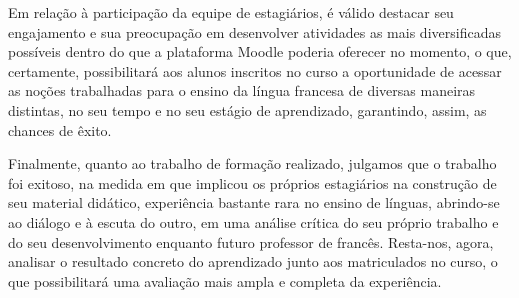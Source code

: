 Em relação à participação da equipe de estagiários, é válido destacar seu engajamento e sua preocupação em desenvolver atividades as mais diversificadas possíveis dentro do que a plataforma Moodle poderia oferecer no momento, o que, certamente, possibilitará aos alunos inscritos no curso a oportunidade de acessar as noções trabalhadas para o ensino da língua francesa de diversas maneiras distintas, no seu tempo e no seu estágio de aprendizado, garantindo, assim, as chances de êxito.

Finalmente, quanto ao trabalho de formação realizado, julgamos que o trabalho foi exitoso, na medida em que implicou os próprios estagiários na construção de seu material didático, experiência bastante rara no ensino de línguas, abrindo-se ao diálogo e à escuta do outro, em uma análise crítica do seu próprio trabalho e do seu desenvolvimento enquanto futuro professor de francês. Resta-nos, agora, analisar o resultado concreto do aprendizado junto aos matriculados no curso, o que possibilitará uma avaliação mais ampla e completa da experiência.
